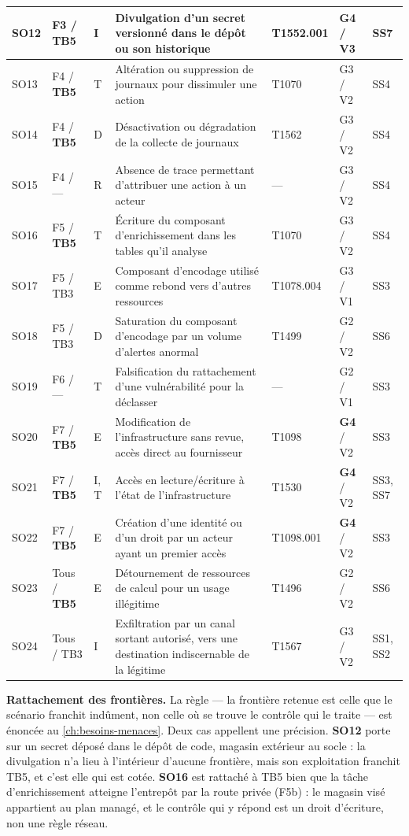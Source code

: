 \begin{longtable}{|P{0.8cm}|P{1.3cm}|P{1.1cm}|P{6.7cm}|P{1.6cm}|P{1.1cm}|P{1.2cm}|}
SO12 & F3 / \textbf{TB5} & I & Divulgation d'un secret versionné dans le dépôt ou son historique & T1552.001 & \textbf{G4} / V3 & SS7 \\ \hline
SO13 & F4 / \textbf{TB5} & T & Altération ou suppression de journaux pour dissimuler une action & T1070 & G3 / V2 & SS4 \\ \hline
SO14 & F4 / \textbf{TB5} & D & Désactivation ou dégradation de la collecte de journaux & T1562 & G3 / V2 & SS4 \\ \hline
SO15 & F4 / --- & R & Absence de trace permettant d'attribuer une action à un acteur & --- & G3 / V2 & SS4 \\ \hline
SO16 & F5 / \textbf{TB5} & T & Écriture du composant d'enrichissement dans les tables qu'il analyse & T1070 & G3 / V2 & SS4 \\ \hline
SO17 & F5 / TB3 & E & Composant d'encodage utilisé comme rebond vers d'autres ressources & T1078.004 & G3 / V1 & SS3 \\ \hline
SO18 & F5 / TB3 & D & Saturation du composant d'encodage par un volume d'alertes anormal & T1499 & G2 / V2 & SS6 \\ \hline
SO19 & F6 / --- & T & Falsification du rattachement d'une vulnérabilité pour la déclasser & --- & G2 / V1 & SS3 \\ \hline
SO20 & F7 / \textbf{TB5} & E & Modification de l'infrastructure sans revue, accès direct au fournisseur & T1098 & \textbf{G4} / V2 & SS3 \\ \hline
SO21 & F7 / \textbf{TB5} & I, T & Accès en lecture/écriture à l'état de l'infrastructure & T1530 & \textbf{G4} / V2 & SS3, SS7 \\ \hline
SO22 & F7 / \textbf{TB5} & E & Création d'une identité ou d'un droit par un acteur ayant un premier accès & T1098.001 & \textbf{G4} / V2 & SS3 \\ \hline
SO23 & Tous / \textbf{TB5} & E & Détournement de ressources de calcul pour un usage illégitime & T1496 & G2 / V2 & SS6 \\ \hline
SO24 & Tous / TB3 & I & Exfiltration par un canal sortant autorisé, vers une destination indiscernable de la légitime & T1567 & G3 / V2 & SS1, SS2 \\
\hline
\end{longtable}
\endgroup

\textbf{Rattachement des frontières.} La règle --- la frontière retenue est celle que le scénario
franchit indûment, non celle où se trouve le contrôle qui le traite --- est énoncée au
\cref{ch:besoins-menaces}. Deux cas appellent une précision. \textbf{SO12} porte sur un
secret déposé dans le dépôt de code, magasin extérieur au socle : la divulgation n'a lieu à
l'intérieur d'aucune frontière, mais son exploitation franchit TB5, et c'est elle qui est cotée.
\textbf{SO16} est rattaché à TB5 bien que la tâche d'enrichissement atteigne l'entrepôt par la
route privée (F5b) : le magasin visé appartient au plan managé, et le contrôle qui y répond est un
droit d'écriture, non une règle réseau.

